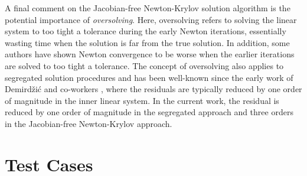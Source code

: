 \documentclass[sn-mathphys,Numbered]{sn-jnl}%
\begin{document}
A final comment on the Jacobian-free Newton-Krylov solution algorithm is the potential importance of \emph{oversolving}.
Here, oversolving refers to solving the linear system to too tight a tolerance during the early Newton iterations, essentially wasting time when the solution is far from the true solution.
In addition, some authors %
\cite{Knoll2004} have shown Newton convergence to be worse when the earlier iterations are solved to too tight a tolerance.
The concept of oversolving also applies to segregated solution procedures and has been well-known since the early work of Demird\v{z}i\'{c} and co-workers \cite{Demirdzic1995}, where the residuals are typically reduced by one order of magnitude in the inner linear system.
In the current work, the residual is reduced by one order of magnitude in the segregated approach and three orders in the Jacobian-free Newton-Krylov approach.





\section{Test Cases}\label{sec:test_cases}

\end{document}
